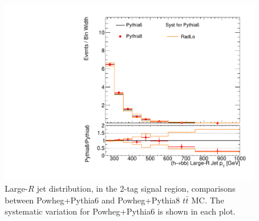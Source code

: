 \begin{figure}[!h]
\begin{center}
\includegraphics[scale=0.33]{./figures/boosted/TTBarPy6VsPy8/TTBarPy6VsPy8_SR_HbbPt_radlo}
\caption{Large-$R$ jet \pt distribution, in the 2-tag signal region, comparisons between Powheg+Pythia6 and Powheg+Pythia8 $t\bar{t}$ MC. 
The systematic variation for Powheg+Pythia6 is shown in each plot.}
\label{fig:boosted_ttbarpy6py8_HbbPt}
\end{center}
\end{figure}

